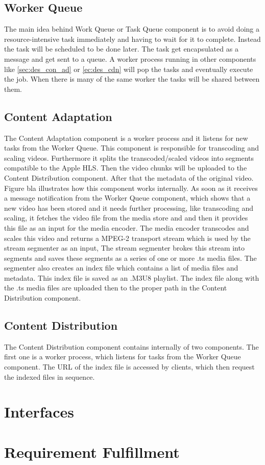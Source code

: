 \subsection{Worker Queue\label{sec:des_worker_queue}}
The main idea behind Work Queue or Task Queue component is to avoid doing a resource-intensive task immediately and having to wait for it to complete. Instead the task will be scheduled to be done later. The task get encapsulated as a message and  get sent to a queue. A worker process running in other components like \ref{sec:des_con_ad} or \ref{ec:des_cdn} will pop the tasks and eventually execute the job. When there is many of the same worker the tasks will be shared between them.


\subsection{Content Adaptation\label{sec:des_con_ad}}
The Content Adaptation component is a worker process and it listens for new tasks from the Worker Queue. This component is responsible for transcoding and scaling videos. Furthermore it splits the transcoded/scaled videos into segments compatible to the Apple HLS. Then the video chunks will be uploaded to the Content Distribution component. After that the metadata of the original video. Figure bla illustrates how this component works internally. As soon as it receives a message notification from the Worker Queue component, which shows that a new video has been stored and it needs further processing, like transcoding and scaling, it fetches the video file from the media store and and then it provides this file as an input for the media encoder. The media encoder transcodes and scales this video and returns a MPEG-2 transport stream which is used by the stream segmenter as an input, The stream segmenter brokes this stream into segments and saves these segments as a series of one or more .ts media files. The segmenter also creates an index file which contains a list of media files and metadata. This index file is saved as an .M3U8 playlist. The index file along with the .ts media files are uploaded then to the proper path in the Content Distribution component.


\subsection{Content Distribution\label{sec:des_cdn}}
The Content Distribution component contains internally of two components. The first one is a worker process, which listens for tasks from the Worker Queue component.
 The URL of the index file is accessed by clients, which then request the indexed files in sequence.
\section{Interfaces\label{sec:des_inter}}

\section{Requirement Fulfillment\label{sec:des_inter}}